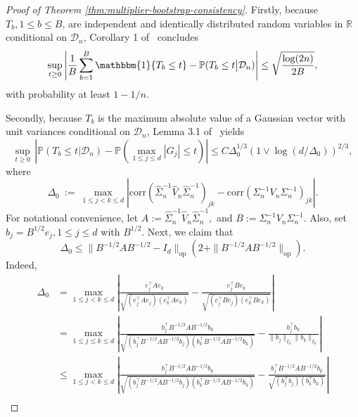\documentclass[11pt]{article}
\begin{document}
\begin{appendices}
\begin{proof}[Proof of Theorem \ref{thm:multiplier-bootstrap-consistency}]
Firstly, because $T_b, 1\le b\le B$, are independent and identically distributed random variables in $\mathbb{R}$ conditional on $\mathcal{D}_n$, Corollary 1 of~\cite{massart1990tight} concludes
\begin{equation}\label{eq:Average-to-conditional-probability}
\sup_{t\ge 0}\left|\frac{1}{B}\sum_{b=1}^B\mathbbm{1}\{T_b \le t\} - \mathbb{P}(T_b \le t\big|\mathcal{D}_n)\right| \le \sqrt{\frac{\log(2n)}{2B}},
\end{equation}
with probability at least $1 - 1/n$.

Secondly, because $T_b$ is the maximum absolute value of a Gaussian vector with unit variances conditional on $\mathcal{D}_n$, Lemma 3.1 of~\cite{Cher13} yields
\begin{equation}\label{eq:Gaussian-comparison-bound}
\sup_{t\ge 0}\,\left|\mathbb{P}(T_b \le t\big|\mathcal{D}_n) - \mathbb{P}\left(\max_{1\le j\le d}|G_j| \le t\right)\right| \le C\Delta_0^{1/3}(1\vee \log(d/\Delta_0))^{2/3},
\end{equation}
where
\[
\Delta_0 ~:=~ \max_{1\le j < k\le d}\left|\mbox{corr}(\widehat{\Sigma}_n^{-1}\widehat{V}_n\widehat{\Sigma}_n^{-1})_{jk} - \mbox{corr}(\Sigma_n^{-1}V_n\Sigma_n^{-1})_{jk}\right|.
\]
For notational convenience, let
$A := \widehat{\Sigma}_n^{-1}\widehat{V}_n\widehat{\Sigma}_n^{-1},$ and $B := \Sigma_n^{-1}V_n\Sigma_n^{-1}.$
Also, set $b_j = B^{1/2}e_j, 1\le j\le d$ with $B^{1/2}$. %
Next, we claim that 
\[
\Delta_0 \le \|B^{-1/2}AB^{-1/2} - I_d\|_{\mathrm{op}}\left(2 + \|B^{-1/2}AB^{-1/2}\|_{\mathrm{op}}\right).
\]
Indeed,
\begin{align*}
\Delta_0 
&= \max_{1\le j < k\le d}\left|\frac{e_j^{\top}Ae_k}{\sqrt{(e_j^{\top}Ae_j)(e_k^{\top}Ae_k)}} - \frac{e_j^{\top}Be_k}{\sqrt{(e_j^{\top}Be_j)(e_k^{\top}Be_k)}}\right|\\
&= \max_{1\le j\le k \le d}\left|\frac{b_j^{\top}B^{-1/2}AB^{-1/2}b_k}{\sqrt{(b_j^{\top}B^{-1/2}AB^{-1/2}b_j)(b_k^{\top}B^{-1/2}AB^{-1/2}b_k)}} - \frac{b_j^{\top}b_k}{\|b_j\|_{I_d}\|b_k\|_{I_d}}\right|\\
&\le \max_{1\le j < k\le d}\left|\frac{b_j^{\top}B^{-1/2}AB^{-1/2}b_k}{\sqrt{(b_j^{\top}B^{-1/2}AB^{-1/2}b_j)(b_k^{\top}B^{-1/2}AB^{-1/2}b_k)}} - \frac{b_j^{\top}B^{-1/2}AB^{-1/2}b_k}{\sqrt{(b_j^{\top}b_j)(b_k^{\top}b_k)}}\right|\\

\end{align*}
\end{proof}
\end{appendices}
\end{document}
